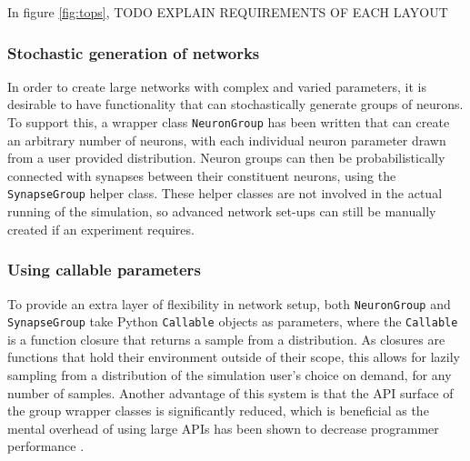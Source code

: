 In figure \ref{fig:tops}, TODO EXPLAIN REQUIREMENTS OF EACH LAYOUT

\subsubsection{Stochastic generation of networks}

In order to create large networks with complex and varied parameters, it is
desirable to have functionality that can stochastically generate groups of
neurons. To support this, a wrapper class \texttt{NeuronGroup} has been written
that can create an arbitrary number of neurons, with each individual neuron
parameter drawn from a user provided distribution. Neuron groups can then be
probabilistically connected with synapses between their constituent neurons,
using the \texttt{SynapseGroup} helper class. These helper classes are not
involved in the actual running of the simulation, so advanced network set-ups
can still be manually created if an experiment requires.

\subsubsection{Using callable parameters}

To provide an extra layer of flexibility in network setup, both
\texttt{NeuronGroup} and \texttt{SynapseGroup} take Python \texttt{Callable}
objects as parameters, where the \texttt{Callable} is a function closure that
returns a sample from a distribution. As closures are functions that hold their
environment outside of their scope, this allows for lazily sampling from a distribution of the simulation user's choice on demand, for any
number of samples. Another advantage of this system is that the API surface of
the group wrapper classes is significantly reduced, which is beneficial as the
mental overhead of using large APIs has been shown to decrease programmer
performance \autocite{ellis_factory_2007,omar_active_2012}.